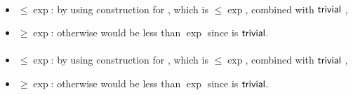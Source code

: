 \paragraph{\ODLA{}\tto\ONFA}
\begin{itemize}
	\item $\le\exp$: by using construction for \hyperref[cost:1DLAto1DFA]{\ODLA{}\tto\ODFA}, which is $\le\exp$, combined with $\mathsf{trivial}$ \ODFA{}\tto\ONFA,
	\item $\ge\exp$: otherwise \hyperref[cost:1DLAto2NFA]{\ODLA{}\tto\TNFA} would be less than $\exp$ since \ONFA{}\tto\TNFA is $\mathsf{trivial}$.
\end{itemize}
\paragraph{\ODLA{}\tto\TDFA}
\begin{itemize}
	\item $\le\exp$: by using construction for \hyperref[cost:1DLAto1DFA]{\ODLA{}\tto\ODFA}, which is $\le\exp$, combined with $\mathsf{trivial}$ \ODFA{}\tto\TDFA,
	\item $\ge\exp$: otherwise \hyperref[cost:1DLAto2NFA]{\ODLA{}\tto\TNFA} would be less than $\exp$ since \TDFA{}\tto\TNFA is $\mathsf{trivial}$.
\end{itemize}


